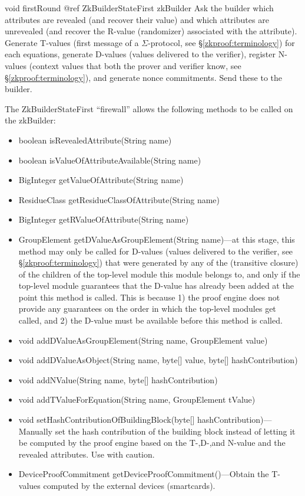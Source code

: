     \begin{method}
    {void}
    {firstRound}
    {
      {@ref ZkBuilderStateFirst zkBuilder}
    }
    Ask the builder which attributes are revealed (and recover their value) and
    which attributes are unrevealed (and recover the R-value (randomizer) associated with the attribute).
    Generate T-values (first message of a $\Sigma$-protocol, see §\ref{zkproof:terminology}) for each equations, generate D-values (values delivered to the verifier),
    register N-values (context values that both the prover and verifier know, see §\ref{zkproof:terminology}), and
    generate nonce commitments. Send these to the builder.

    The ZkBuilderStateFirst ``firewall'' allows the following methods to be called on the zkBuilder:
      \begin{itemize}
      \item boolean isRevealedAttribute(String name)
      \item boolean isValueOfAttributeAvailable(String name)
      \item BigInteger getValueOfAttribute(String name)
      \item ResidueClass getResidueClassOfAttribute(String name)
      \item BigInteger getRValueOfAttribute(String name)
      \item GroupElement getDValueAsGroupElement(String name)---at this stage, this method may only be called for
        D-values (values delivered to the verifier, see §\ref{zkproof:terminology}) that were generated by any of the (transitive closure) of the children of the top-level module
        this module belongs to, and only if the top-level module guarantees that the D-value has already been
        added at the point this method is called. This is because 1) the proof engine does not provide any guarantees
        on the order in which the top-level modules get called, and 2) the D-value must be available before this
        method is called.
      \item void addDValueAsGroupElement(String name, GroupElement value)
      \item void addDValueAsObject(String name, byte[] value, byte[] hashContribution)
      \item void addNValue(String name, byte[] hashContribution)
      \item void addTValueForEquation(String name, GroupElement tValue)
      \item void setHashContributionOfBuildingBlock(byte[] hashContribution)---Manually set the
      hash contribution of the building block instead of letting it be computed by
      the proof engine based on the T-,D-,and N-value and the revealed attributes. Use with caution.
      \item DeviceProofCommitment getDeviceProofCommitment()---Obtain the T-values computed by
      the external devices (smartcards).
      \end{itemize}
    \end{method}
